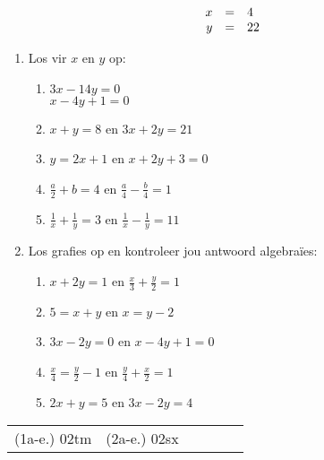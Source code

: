 \begin{wex}
{
\begin{equation*}
\begin{array}{ccl}\hfill x& =& 4\hfill \\ \hfill y& =& 22\hfill \end{array}
\end{equation*}
\vspace*{-15pt}
}
\end{wex}

\begin{exercises}{}
{
\begin{enumerate}[noitemsep, label=\textbf{\arabic*}. ] 
\item Los vir $x$ en $y$ op: 
\begin{enumerate}[noitemsep, label=\textbf{(\alph*)} ] 
\item $3x-14y=0$\\$x-4y+1=0$
\item $x+y=8$ en $3x + 2y = 21$
\item $y=2x+1$ en $x + 2y + 3 = 0$
\item $\frac{a}{2}+b=4$ en $\frac{a}{4} -\frac{b}{4}=1$
\item $\frac{1}{x}+\frac{1}{y}=3$ en $\frac{1}{x}-\frac{1}{y}=11$
\end{enumerate}

\item Los grafies op en kontroleer jou antwoord algebraïes:

\begin{enumerate}[noitemsep, label=\textbf{(\alph*)} ] 

\item  $x+2y=1$ en $\frac{x}{3} + \frac{y}{2} = 1$
\item $5= x+y$ en $x = y-2$
\item $3x - 2y = 0$ en $x - 4y + 1 = 0$
\item $\frac{x}{4}=\frac{y}{2}-1$  en $\frac{y}{4}+\frac{x}{2}=1$
\item $2x+y=5$ en $3x-2y=4$
\end{enumerate}
\end{enumerate}
\practiceinfo
\par 
\par \begin{tabular}[h]{cccccc}
(1a-e.) 02tm &  (2a-e.) 02sx & \end{tabular}
}
\end{exercises}


